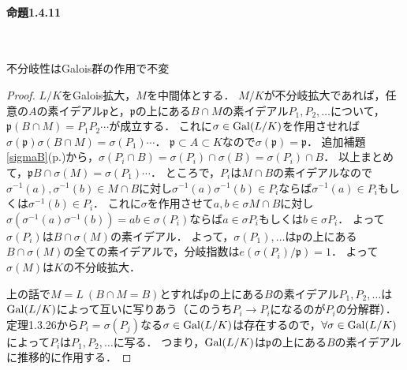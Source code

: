 \paragraph{命題1.4.11}~
\begin{screen}
  不分岐性はGalois群の作用で不変
\end{screen}
\begin{proof}
  $L/K$をGalois拡大，$M$を中間体とする．
  $M/K$が不分岐拡大であれば，任意の$A$の素イデアル$\mathfrak{p}$と，$\mathfrak{p}$の上にある$B\cap M$の素イデアル$P_1, P_2, \ldots$について，$\mathfrak{p}(B\cap M) = P_1P_2\cdots$が成立する．
  これに$\sigma\in\operatorname{Gal}(L/K)$を作用させれば$\sigma(\mathfrak{p})\sigma(B\cap M) = \sigma(P_1)\cdots$．
  $\mathfrak{p}\subset A\subset K$なので$\sigma(\mathfrak{p}) = \mathfrak{p}$．
  追加補題\ref{sigmaB}(p.\pageref{sigmaB})から，$\sigma(P_i\cap B) = \sigma(P_i)\cap\sigma(B) = \sigma(P_i)\cap B$．
  以上まとめて，$\mathfrak{p}B\cap\sigma(M) = \sigma(P_1)\cdots$．
  ところで，$P_i$は$M\cap B$の素イデアルなので$\sigma^{-1}(a), \sigma^{-1}(b)\in M\cap B$に対し$\sigma^{-1}(a)\sigma^{-1}(b)\in P_i$ならば$\sigma^{-1}(a)\in P_i$もしくは$\sigma^{-1}(b)\in P_i$．
  これに$\sigma$を作用させて$a, b\in\sigma{M}\cap B$に対し$\sigma(\sigma^{-1}(a)\sigma^{-1}(b)) = ab\in\sigma(P_i)$ならば$a\in\sigma{P_i}$もしくは$b\in\sigma{P_i}$．
  よって$\sigma(P_i)$は$B\cap\sigma(M)$の素イデアル．
  よって，$\sigma(P_1), \ldots$は$\mathfrak{p}$の上にある$B\cap\sigma(M)$の全ての素イデアルで，分岐指数は$e(\sigma(P_i)/\mathfrak{p}) = 1$．
  よって$\sigma(M)$は$K$の不分岐拡大．

  上の話で$M = L\ (B\cap M = B)$とすれば$\mathfrak{p}$の上にある$B$の素イデアル$P_1, P_2, \ldots$は$\operatorname{Gal}(L/K)$によって互いに写りあう（このうち$P_i\to P_i$になるのが$P_i$の分解群）．
  定理1.3.26から$P_i = \sigma(P_j)$なる$\sigma\in\operatorname{Gal}(L/K)$は存在するので，$\forall{\sigma}\in\operatorname{Gal}(L/K)$によって$P_i$は$P_1, P_2, \ldots$に写る．
  つまり，$\operatorname{Gal}(L/K)$は$\mathfrak{p}$の上にある$B$の素イデアルに推移的に作用する．
\end{proof}

